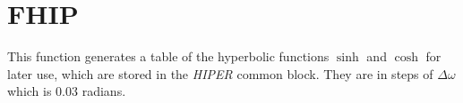 \section{FHIP}
\label{sect:fhip}

\noindent This function generates a table of the hyperbolic functions
$\sinh$ and $\cosh$ for later use, which are stored in the {\em HIPER}
common block. They are in steps of $\Delta\omega$ which is 0.03 radians.\\
